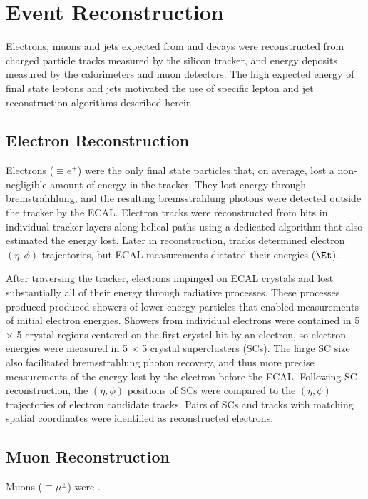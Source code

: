 \chapter{Event Reconstruction}
\label{sec:reco_chapter}

Electrons, muons and jets expected from \WR and \nul decays were reconstructed from charged particle 
tracks measured by the silicon tracker, and energy deposits measured by the calorimeters and muon 
detectors.  The high expected energy of final state leptons and jets motivated the use of specific 
lepton and jet reconstruction algorithms described herein.


\section{Electron Reconstruction}
\label{sec:eleReco}
Electrons ($\equiv e^{\pm}$) were the only final state particles that, on average, lost a non-negligible 
amount of energy in the tracker.  They lost energy through bremstrahhlung, and the resulting bremsstrahlung 
photons were detected outside the tracker by the ECAL.  Electron tracks were reconstructed from hits in 
individual tracker layers along helical paths using a dedicated algorithm that also estimated the energy lost.  
Later in reconstruction, tracks determined electron $(\eta, \phi)$ trajectories, but ECAL measurements 
dictated their energies ($\Et$).

After traversing the tracker, electrons impinged on ECAL crystals and lost substantially all of their 
energy through radiative processes.  These processes produced produced showers of lower energy particles 
that enabled measurements of initial electron energies.  Showers from individual electrons were contained 
in 5 $\times$ 5 crystal regions centered on the first crystal hit by an electron, so electron energies 
were measured in 5 $\times$ 5 crystal superclusters (SCs).  The large SC size also facilitated 
bremsstrahlung photon recovery, and thus more precise measurements of the energy lost by the electron 
before the ECAL.  Following SC reconstruction, the $(\eta, \phi)$ positions of SCs were compared to 
the $(\eta, \phi)$ trajectories of electron candidate tracks.  Pairs of SCs and tracks with matching 
spatial coordinates were identified as reconstructed electrons.


\section{Muon Reconstruction}
\label{sec:muReco}
Muons ($\equiv \mu^{\pm}$) were .

